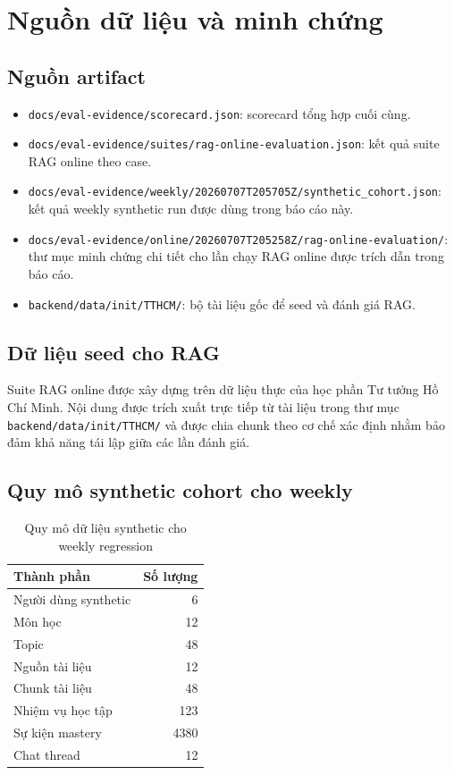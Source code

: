 \documentclass[12pt,a4paper]{article}
\begin{document}
\section{Nguồn dữ liệu và minh chứng}

\subsection{Nguồn artifact}

\begin{itemize}
    \item \texttt{docs/eval-evidence/scorecard.json}: scorecard tổng hợp cuối cùng.
    \item \texttt{docs/eval-evidence/suites/rag-online-evaluation.json}: kết quả suite RAG online theo case.
    \item \texttt{docs/eval-evidence/weekly/20260707T205705Z/synthetic\_cohort.json}: kết quả weekly synthetic run được dùng trong báo cáo này.
    \item \texttt{docs/eval-evidence/online/20260707T205258Z/rag-online-evaluation/}: thư mục minh chứng chi tiết cho lần chạy RAG online được trích dẫn trong báo cáo.
    \item \texttt{backend/data/init/TTHCM/}: bộ tài liệu gốc để seed và đánh giá RAG.
\end{itemize}

\subsection{Dữ liệu seed cho RAG}

Suite RAG online được xây dựng trên dữ liệu thực của học phần Tư tưởng Hồ Chí Minh. Nội dung được trích xuất trực tiếp từ tài liệu trong thư mục \texttt{backend/data/init/TTHCM/} và được chia chunk theo cơ chế xác định nhằm bảo đảm khả năng tái lập giữa các lần đánh giá.

\subsection{Quy mô synthetic cohort cho weekly}

\begin{table}[H]
\centering
\small
\begin{tabular}{lr}
\toprule
\textbf{Thành phần} & \textbf{Số lượng} \\
\midrule
Người dùng synthetic & 6 \\
Môn học & 12 \\
Topic & 48 \\
Nguồn tài liệu & 12 \\
Chunk tài liệu & 48 \\
Nhiệm vụ học tập & 123 \\
Sự kiện mastery & 4380 \\
Chat thread & 12 \\
\bottomrule
\end{tabular}
\caption{Quy mô dữ liệu synthetic cho weekly regression}
\end{table}
\end{document}

